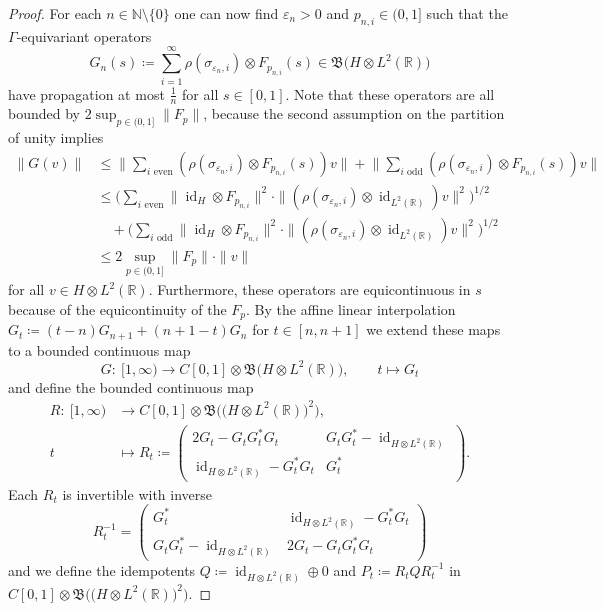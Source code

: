 \documentclass[pdftex]{sigma}
\numberwithin{equation}{section}
\theoremstyle{definition}
\newcommand{\N}{\mathbb{N}}
\newcommand{\R}{\mathbb{R}}
\DeclareMathOperator{\id}{id}
\newcommand{\Lin}{{\mathfrak{B}}}
\begin{document}
\begin{proof}
For each $n\in\N\setminus\{0\}$ one can now find $\varepsilon_n>0$ and $p_{n,i}\in(0,1]$ such that the $\Gamma$-equivariant operators
\[
G_n(s)\coloneqq \sum_{i=1}^\infty\rho(\sigma_{\varepsilon_n,i})\otimes F_{p_{n,i}}(s)\in\Lin\big(H\otimes L^2(\R)\big)
\]
have propagation at most $\frac1n$ for all $s\in[0,1]$.
Note that these operators are all bounded by $2\sup_{p\in(0,1]}\|F_p\|$, because the second assumption on the partition of
unity implies
\begin{align*}
\|G(v)\|&\leq\biggl\|\sum_{i\text{ even}}(\rho(\sigma_{\varepsilon_n,i})\otimes F_{p_{n,i}}(s))v\biggr\|+\biggl\|\sum_{i\text{ odd}}(\rho(\sigma_{\varepsilon_n,i})\otimes F_{p_{n,i}}(s))v\biggr\|
\\
&\leq\biggl(\sum_{i\text{ even}}\|\id_H\otimes F_{p_{n,i}}\|^2\cdot\|(\rho(\sigma_{\varepsilon_n,i})\otimes\id_{L^2(\R)}) v\|^2\biggr)^{1/2}
\\
&\quad +\biggl(\sum_{i\text{ odd}}\|\id_H\otimes F_{p_{n,i}}\|^2\cdot\|(\rho(\sigma_{\varepsilon_n,i})\otimes\id_{L^2(\R)}) v\|^2\biggr)^{1/2}
\\
&\leq 2\sup_{p\in(0,1]}\|F_p\|\cdot\|v\|
\end{align*}
for all $v\in H\otimes L^2(\R)$.
Furthermore, these operators are equicontinuous in $s$ because of the equicontinuity of the $F_p$.
By the affine linear interpolation $G_t\coloneqq (t-n)G_{n+1}+(n+1-t)G_n$ for $t\in[n,n+1]$ we extend these maps to a bounded continuous map
\[
G\colon\ [1,\infty)\to C[0,1]\otimes\Lin\big(H\otimes L^2(\R)\big),\qquad t\mapsto G_t
\]
and define the bounded continuous map
\begin{align*}
R\colon\ [1,\infty)&\to C[0,1]\otimes\Lin\big(\big(H\otimes L^2(\R)\big)^2\big),
\\[.5ex]
t&\mapsto R_t\coloneqq\begin{pmatrix}2G_t-G_tG_t^*G_t&G_tG_t^*-\id_{H\otimes L^2(\R)}\\\id_{H\otimes L^2(\R)}-G_t^*G_t&G_t^*\end{pmatrix}\!.
\end{align*}
Each $R_t$ is invertible with inverse
\[
R_t^{-1}=\begin{pmatrix}G_t^*&\id_{H\otimes L^2(\R)}-G_t^*G_t
\\[.5ex]
G_tG_t^*-\id_{H\otimes L^2(\R)}&2G_t-G_tG_t^*G_t\end{pmatrix}
\]
and we define the idempotents $Q\coloneqq\id_{H\otimes L^2(\R)}\oplus 0$ and $P_t\coloneqq R_tQR_t^{-1}$ in $C[0,1]\otimes\Lin\big(\big(H\otimes L^2(\R)\big)^2\big)$.


\end{proof}
\end{document}
